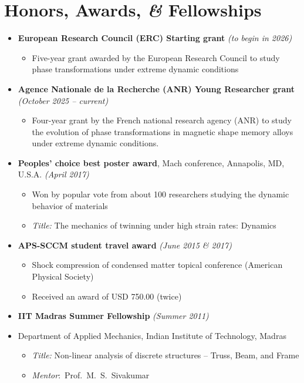 \documentclass[a4paper,10pt, oneside]{article}
\begin{document}
	\section*{{Honors, Awards, \emph{\&} Fellowships}}
	\begin{itemize}[wide, labelwidth=!, labelindent=-1em]
		\item[]\textbf{European Research Council (ERC) Starting grant} \hfill \textit{(to begin in 2026)}
		\begin{itemize}[wide, labelwidth=!, labelindent=0em]
			\item Five-year grant awarded by the European Research Council to study phase transformations under extreme dynamic conditions
		\end{itemize} 
		\item[]\textbf{Agence Nationale de la Recherche (ANR) Young Researcher grant} \hfill \textit{(October 2025 -- current)}
		\begin{itemize}[wide, labelwidth=!, labelindent=0em]
			\item Four-year grant by the French national research agency (ANR) to study the evolution of phase transformations in magnetic shape memory alloys under extreme dynamic conditions.
		\end{itemize} 
		\item[]\textbf{Peoples' choice best poster award}, Mach conference, Annapolis, MD, U.S.A. \hfill \textit{(April 2017)}
		\begin{itemize}[wide, labelwidth=!, labelindent=0em]
			\item Won by popular vote from about 100 researchers studying the dynamic behavior of materials
			\item \textit{Title:} The mechanics of twinning under high strain rates: Dynamics
		\end{itemize} 
		\vspace*{0.5em}
		\item[]\textbf{APS-SCCM student travel award} \hfill \textit{(June 2015 {\&} 2017)}
		\begin{itemize}[leftmargin=*]
			\item Shock compression of condensed matter topical conference (American Physical Society)
			\item Received an award of USD 750.00 (twice)
		\end{itemize}
		\vspace*{0.5em}
		\item[]\textbf{IIT Madras Summer Fellowship} \hfill \textit{(Summer 2011)}
		\item[]Department of Applied Mechanics, Indian Institute of Technology, Madras
		\begin{itemize}[wide, labelwidth=!, labelindent=0em]
			\item \textit{Title: }Non-linear analysis of discrete structures -- Truss, Beam, and Frame
			\item \textit{Mentor}:~Prof.~M.~S.~Sivakumar
		\end{itemize}
	\end{itemize}
	
\end{document}

